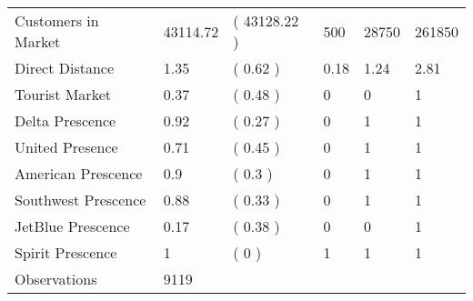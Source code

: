 \begin{tabular}[t]{llllll}
\hspace{1em}Customers in Market & 43114.72 & ( 43128.22 ) & 500 & 28750 & 261850\\
\hspace{1em}Direct Distance & 1.35 & ( 0.62 ) & 0.18 & 1.24 & 2.81\\
\hspace{1em}Tourist Market & 0.37 & ( 0.48 ) & 0 & 0 & 1\\
\hspace{1em}Delta Prescence & 0.92 & ( 0.27 ) & 0 & 1 & 1\\
\hspace{1em}United Presence & 0.71 & ( 0.45 ) & 0 & 1 & 1\\
\hspace{1em}American Prescence & 0.9 & ( 0.3 ) & 0 & 1 & 1\\
\hspace{1em}Southwest Prescence & 0.88 & ( 0.33 ) & 0 & 1 & 1\\
\hspace{1em}JetBlue Prescence & 0.17 & ( 0.38 ) & 0 & 0 & 1\\
\hspace{1em}Spirit Prescence & 1 & ( 0 ) & 1 & 1 & 1\\
\midrule
\hspace{1em}Observations & 9119 &  &  &  & \\
\bottomrule
\end{tabular}
